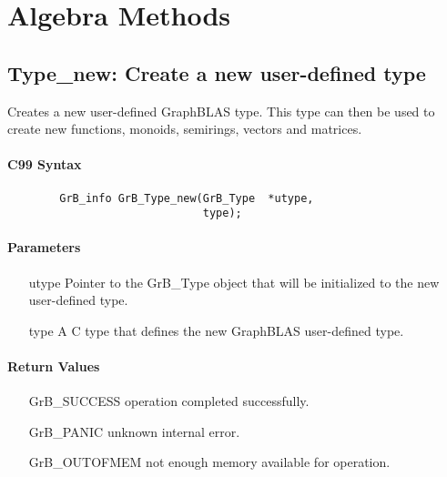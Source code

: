 \section{Algebra Methods}
\label{Sec:AlgebraMethods}



\subsection{{\sf Type\_new}: Create a new user-defined type}

Creates a new user-defined GraphBLAS type. This type can then be used to create new
functions, monoids, semirings, vectors and matrices.

\paragraph{C99 Syntax}

\begin{verbatim}
        GrB_info GrB_Type_new(GrB_Type	*utype,
                              type);
\end{verbatim}

\paragraph{Parameters}

\begin{itemize}[leftmargin=1.1in]
	\item[{\sf utype}] 	Pointer to the {\sf GrB\_Type} object that will be initialized to the new user-defined type.
	\item[{\sf type}]	A C type that defines the new GraphBLAS user-defined type.
\end{itemize}

\paragraph{Return Values}

\begin{itemize}[leftmargin=2.1in]
\item[{\sf GrB\_SUCCESS}]           operation completed successfully.
\item[{\sf GrB\_PANIC}]             unknown internal error.
\item[{\sf GrB\_OUTOFMEM}]          not enough memory available for operation.
\end{itemize}

